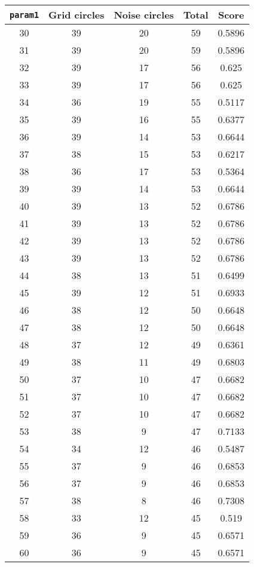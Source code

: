 \documentclass[letterpaper, 12pt]{article}
\begin{document}
\begin{longtable}{|c|c|c|c|c|}
\hline
\textbf{\texttt{param1}} & \textbf{Grid circles} & \textbf{Noise circles} & \textbf{Total} & \textbf{Score} \\
\hline
30 & 39 & 20 & 59 & 0.5896 \\
\hline
31 & 39 & 20 & 59 & 0.5896 \\
\hline
32 & 39 & 17 & 56 & 0.625 \\
\hline
33 & 39 & 17 & 56 & 0.625 \\
\hline
34 & 36 & 19 & 55 & 0.5117 \\
\hline
35 & 39 & 16 & 55 & 0.6377 \\
\hline
36 & 39 & 14 & 53 & 0.6644 \\
\hline
37 & 38 & 15 & 53 & 0.6217 \\
\hline
38 & 36 & 17 & 53 & 0.5364 \\
\hline
39 & 39 & 14 & 53 & 0.6644 \\
\hline
40 & 39 & 13 & 52 & 0.6786 \\
\hline
41 & 39 & 13 & 52 & 0.6786 \\
\hline
42 & 39 & 13 & 52 & 0.6786 \\
\hline
43 & 39 & 13 & 52 & 0.6786 \\
\hline
44 & 38 & 13 & 51 & 0.6499 \\
\hline
45 & 39 & 12 & 51 & 0.6933 \\
\hline
46 & 38 & 12 & 50 & 0.6648 \\
\hline
47 & 38 & 12 & 50 & 0.6648 \\
\hline
48 & 37 & 12 & 49 & 0.6361 \\
\hline
49 & 38 & 11 & 49 & 0.6803 \\
\hline
50 & 37 & 10 & 47 & 0.6682 \\
\hline
51 & 37 & 10 & 47 & 0.6682 \\
\hline
52 & 37 & 10 & 47 & 0.6682 \\
\hline
53 & 38 & 9 & 47 & 0.7133 \\
\hline
54 & 34 & 12 & 46 & 0.5487 \\
\hline
55 & 37 & 9 & 46 & 0.6853 \\
\hline
56 & 37 & 9 & 46 & 0.6853 \\
\hline
57 & 38 & 8 & 46 & 0.7308 \\
\hline
58 & 33 & 12 & 45 & 0.519 \\
\hline
59 & 36 & 9 & 45 & 0.6571 \\
\hline
60 & 36 & 9 & 45 & 0.6571 \\

\end{longtable}
\end{document}
